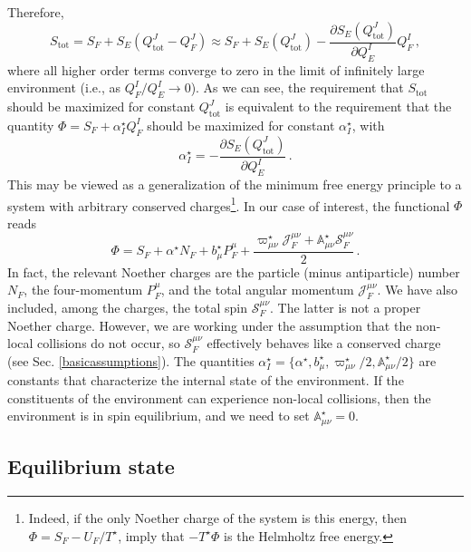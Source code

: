 \documentclass[12pt,aps,prd,nofootinbib,noshowkeys,noshowpacs,longbibliography,
superscriptaddress,tightenlines,floatfix,preprintnumbers]{revtex4-2}
\begin{document}
Therefore,
\begin{equation} 
S_{\text{tot}}=S_F+S_E(Q_{\text{tot}}^J-Q^J_F) \approx S_F+S_E(Q_{\text{tot}}^J)-\dfrac{\partial S_E(Q_{\text{tot}}^J)}{\partial Q_E^I} Q_F^I \, ,
\end{equation}
where all higher order terms converge to zero in the limit of infinitely large environment (i.e., as $Q_F^I/Q_E^I \rightarrow 0$). As we can see, the requirement that $S_{\text{tot}}$ should be maximized for constant $Q_{\text{tot}}^J$ is equivalent to the requirement that the quantity $\Phi=S_F +\alpha^\star_I Q_F^I$ should be maximized for constant $\alpha^\star_I$, with
\begin{equation}
    \alpha^\star_I = -\dfrac{\partial S_E(Q_{\text{tot}}^J)}{\partial Q_E^I} \, .
\end{equation}
This may be viewed as a generalization of the minimum free energy principle \cite{Callen_book} to a system with arbitrary conserved charges\footnote{Indeed, if the only Noether charge of the system is this energy, then $\Phi=S_F-U_F/T^\star$, imply that $-T^\star \Phi$ is the Helmholtz free energy.}. In our case of interest, the functional $\Phi$ reads
\begin{equation}
\label{functional}
    \Phi= S_F +\alpha^\star N_F +b^\star_\mu P_F^\mu +\dfrac{\varpi^\star_{\mu \nu} \mathcal{J}^{\mu \nu}_F +\mathbb{A}^\star_{\mu \nu}\mathcal{S}^{\mu \nu}_F}{2} \, .
\end{equation}
In fact, the relevant Noether charges are the particle (minus antiparticle) number $N_F$, the four-momentum $P^\mu_F$, and the total angular momentum $\mathcal{J}^{\mu \nu}_F$. We have also included, among the charges, the total spin $\mathcal{S}^{\mu \nu}_F$. The latter is not a proper Noether charge. However, we are working under the assumption that the non-local collisions do not occur, so $\mathcal{S}^{\mu \nu}_F$ effectively behaves like a conserved charge (see Sec. \ref{basicassumptions}). The quantities $\alpha^\star_I = \{\alpha^\star, b^\star_\mu, \varpi^\star_{\mu \nu}/2,\mathbb{A}_{\mu \nu}^\star/2 \}$ are constants that characterize the internal state of the environment. If the constituents of the environment can experience non-local collisions, then the environment is in spin equilibrium, and we need to set $\mathbb{A}_{\mu \nu}^\star=0$.

\subsection{Equilibrium state}\label{statemech}
\end{document}

